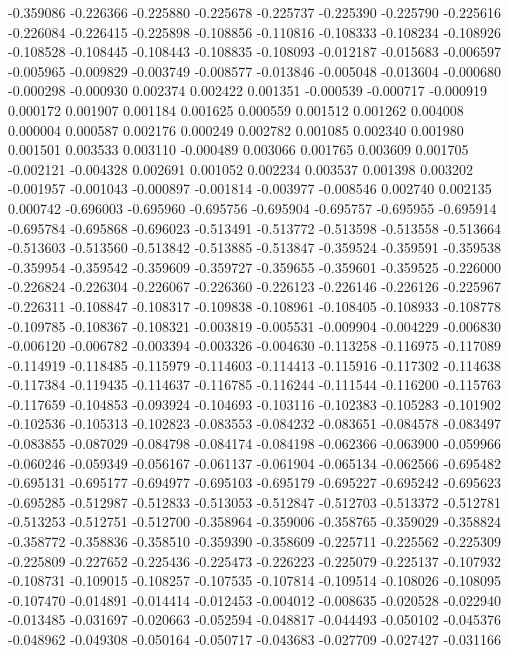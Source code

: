 -0.359086
-0.226366
-0.225880
-0.225678
-0.225737
-0.225390
-0.225790
-0.225616
-0.226084
-0.226415
-0.225898
-0.108856
-0.110816
-0.108333
-0.108234
-0.108926
-0.108528
-0.108445
-0.108443
-0.108835
-0.108093
-0.012187
-0.015683
-0.006597
-0.005965
-0.009829
-0.003749
-0.008577
-0.013846
-0.005048
-0.013604
-0.000680
-0.000298
-0.000930
0.002374
0.002422
0.001351
-0.000539
-0.000717
-0.000919
0.000172
0.001907
0.001184
0.001625
0.000559
0.001512
0.001262
0.004008
0.000004
0.000587
0.002176
0.000249
0.002782
0.001085
0.002340
0.001980
0.001501
0.003533
0.003110
-0.000489
0.003066
0.001765
0.003609
0.001705
-0.002121
-0.004328
0.002691
0.001052
0.002234
0.003537
0.001398
0.003202
-0.001957
-0.001043
-0.000897
-0.001814
-0.003977
-0.008546
0.002740
0.002135
0.000742
-0.696003
-0.695960
-0.695756
-0.695904
-0.695757
-0.695955
-0.695914
-0.695784
-0.695868
-0.696023
-0.513491
-0.513772
-0.513598
-0.513558
-0.513664
-0.513603
-0.513560
-0.513842
-0.513885
-0.513847
-0.359524
-0.359591
-0.359538
-0.359954
-0.359542
-0.359609
-0.359727
-0.359655
-0.359601
-0.359525
-0.226000
-0.226824
-0.226304
-0.226067
-0.226360
-0.226123
-0.226146
-0.226126
-0.225967
-0.226311
-0.108847
-0.108317
-0.109838
-0.108961
-0.108405
-0.108933
-0.108778
-0.109785
-0.108367
-0.108321
-0.003819
-0.005531
-0.009904
-0.004229
-0.006830
-0.006120
-0.006782
-0.003394
-0.003326
-0.004630
-0.113258
-0.116975
-0.117089
-0.114919
-0.118485
-0.115979
-0.114603
-0.114413
-0.115916
-0.117302
-0.114638
-0.117384
-0.119435
-0.114637
-0.116785
-0.116244
-0.111544
-0.116200
-0.115763
-0.117659
-0.104853
-0.093924
-0.104693
-0.103116
-0.102383
-0.105283
-0.101902
-0.102536
-0.105313
-0.102823
-0.083553
-0.084232
-0.083651
-0.084578
-0.083497
-0.083855
-0.087029
-0.084798
-0.084174
-0.084198
-0.062366
-0.063900
-0.059966
-0.060246
-0.059349
-0.056167
-0.061137
-0.061904
-0.065134
-0.062566
-0.695482
-0.695131
-0.695177
-0.694977
-0.695103
-0.695179
-0.695227
-0.695242
-0.695623
-0.695285
-0.512987
-0.512833
-0.513053
-0.512847
-0.512703
-0.513372
-0.512781
-0.513253
-0.512751
-0.512700
-0.358964
-0.359006
-0.358765
-0.359029
-0.358824
-0.358772
-0.358836
-0.358510
-0.359390
-0.358609
-0.225711
-0.225562
-0.225309
-0.225809
-0.227652
-0.225436
-0.225473
-0.226223
-0.225079
-0.225137
-0.107932
-0.108731
-0.109015
-0.108257
-0.107535
-0.107814
-0.109514
-0.108026
-0.108095
-0.107470
-0.014891
-0.014414
-0.012453
-0.004012
-0.008635
-0.020528
-0.022940
-0.013485
-0.031697
-0.020663
-0.052594
-0.048817
-0.044493
-0.050102
-0.045376
-0.048962
-0.049308
-0.050164
-0.050717
-0.043683
-0.027709
-0.027427
-0.031166
